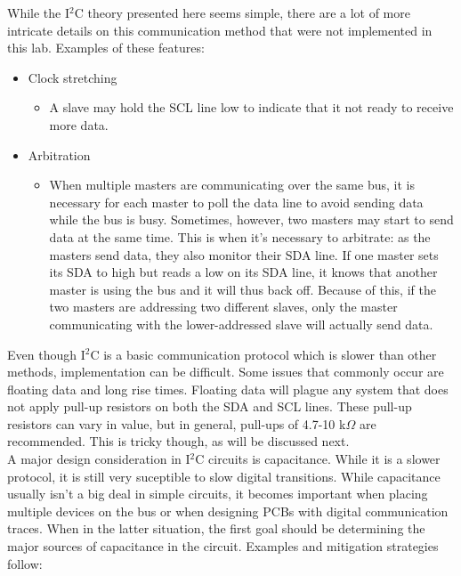 \documentclass{article}
\begin{document}
While the I\(^2\)C theory presented here seems simple, there are a lot of more intricate details on this communication method that were not implemented in this lab. Examples of these features:

\begin{itemize}
	\item Clock stretching
	\begin{itemize}
		\item A slave may hold the SCL line low to indicate that it not ready to receive more data.
	\end{itemize}
	\item Arbitration
	\begin{itemize}
		\item When multiple masters are communicating over the same bus, it is necessary for each master to poll the data line to avoid sending data while the bus is busy. Sometimes, however, two masters may start to send data at the same time. This is when it's necessary to arbitrate: as the masters send data, they also monitor their SDA line. If one master sets its SDA to high but reads a low on its SDA line, it knows that another master is using the bus and it will thus back off. Because of this, if the two masters are addressing two different slaves, only the master communicating with the lower-addressed slave will actually send data.
	\end{itemize}
\end{itemize}


\noindent Even though I\(^2\)C is a basic communication protocol which is slower than other methods, implementation can be difficult. Some issues that commonly occur are floating data and long rise times. Floating data will plague any system that does not apply pull-up resistors on both the SDA and SCL lines. These pull-up resistors can vary in value, but in general, pull-ups of 4.7-10 k\(\Omega\) are recommended. This is tricky though, as will be discussed next.\\

\noindent A major design consideration in I\(^2\)C circuits is capacitance. While it is a slower protocol, it is still very suceptible to slow digital transitions. While capacitance usually isn't a big deal in simple circuits, it becomes important when placing multiple devices on the bus or when designing PCBs with digital communication traces. When in the latter situation, the first goal should be determining the major sources of capacitance in the circuit. Examples and mitigation strategies follow:
\end{document}
